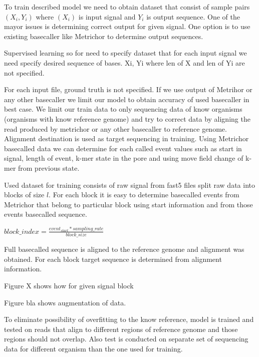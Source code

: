 \documentclass[times, utf8, diplomski, numeric, english]{fer}
\begin{document}
To train described model we need to obtain dataset that consist of sample pairs $(X_i, Y_i)$ where $(X_i)$ is input signal and $Y_i$ is output sequence. 
One of the mayor issues is determining correct output for given signal. One option is to use existing basecaller like Metrichor to determine output sequences. 

 




Supervised learning so for need to specify dataset that for each input signal we need specify desired sequence of bases.
{Xi, Yi} where len of X and len of Yi are not specified.

For each input file, ground truth is not specified. If we use output of Metrihor or any other basecaller we limit our model to
obtain accuracy of used basecaller in best case. We limit our train data to only sequencing data of know organisms (organisms with know reference genome) and try to correct data by aligning the read produced by metrichor or any other basecaller to reference genome. Alignment destination is used as target sequencing in training. 
Using Metrichor basecalled data we can determine for each called event values such as start in signal, length of event, k-mer state in the pore and using move field change of k-mer from previous state. 

Used dataset for training consists of raw signal from fast5 files split raw data into blocks of size $l$.
For each block it is easy to determine basecalled events from Metrichor that belong to particular block using start information and from those events basecalled sequence. 


$block\_index =  \frac{event_{start} * sampling\_rate}{block\_size}$

Full basecalled sequence is aligned to the reference genome and alignment was obtained. For each block target sequence is determined from alignment information.

Figure X shows how for given signal block


Figure bla shows augmentation of data.

To eliminate possibility of overfitting to the know reference, model is trained and tested on reads that align to different regions of reference genome and those regions should not overlap. Also test is conducted on separate set of sequencing data for different organism than the one used for training. 
\end{document}
